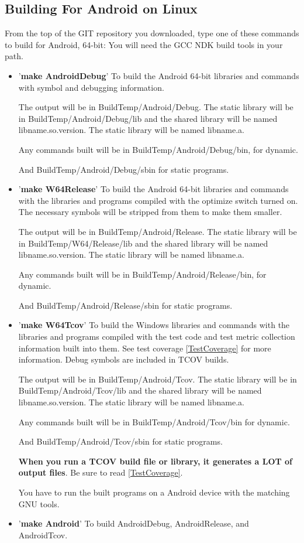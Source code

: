 \subsection{Building For Android on Linux}
  
From the top of the GIT repository you downloaded,
type one of these commands to build for Android, 64-bit:
You will need the GCC NDK build tools in your path.

\begin{itemize}
\item '\textbf{make AndroidDebug}'
  To build the Android 64-bit libraries and commands with symbol
  and debugging information.

  The output will be in BuildTemp/Android/Debug.
  The static library will be in BuildTemp/Android/Debug/lib
  and the shared library will be named lib{name}.so.{version}.
  The static library will be named lib{name}.a.
  
  Any commands built will be in BuildTemp/Android/Debug/bin,
  for dynamic.
  
  And BuildTemp/Android/Debug/sbin for static programs.

\item '\textbf{make W64Release}'
  To build the Android 64-bit libraries and commands with the libraries
  and programs compiled with the optimize switch turned on.
  The necessary symbols will be stripped from them to make
  them smaller.

  The output will be in BuildTemp/Android/Release.
  The static library will be in BuildTemp/W64/Release/lib
  and the shared library will be named lib{name}.so.{version}.
  The static library will be named lib{name}.a.
  
  Any commands built will be in BuildTemp/Android/Release/bin,
  for dynamic.
  
  And BuildTemp/Android/Release/sbin for static programs.
  
\item '\textbf{make W64Tcov}'
  To build the Windows libraries and commands with the libraries
  and programs compiled with the test code and test metric
  collection information built into them.
  See test coverage \ref{TestCoverage} for more information.
  Debug symbols are included in TCOV builds.

  The output will be in BuildTemp/Android/Tcov.
  The static library will be in BuildTemp/Android/Tcov/lib
  and the shared library will be named lib{name}.so.{version}.
  The static library will be named lib{name}.a.
  
  Any commands built will be in BuildTemp/Android/Tcov/bin
  for dynamic.

  And BuildTemp/Android/Tcov/sbin for static programs.

  \textbf{When you run a TCOV build file or library, it generates a LOT of  output files}. Be sure to read \ref{TestCoverage}.

  You have to run the built programs on a Android device
  with the matching GNU tools.
  
\item '\textbf{make Android}'
  To build AndroidDebug, AndroidRelease, and AndroidTcov.
\end{itemize}


